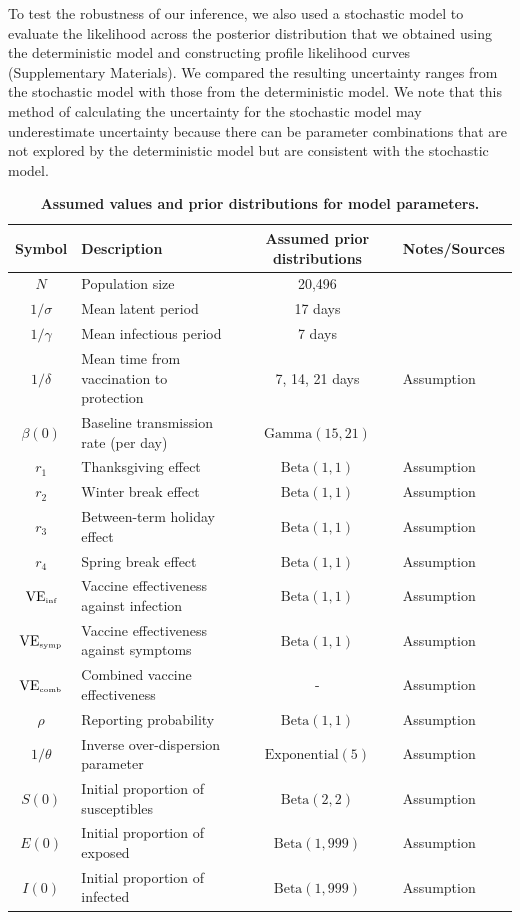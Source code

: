 \documentclass[12pt]{article}
\begin{document}
To test the robustness of our inference, we also used a stochastic model to evaluate the likelihood across the posterior distribution that we obtained using the deterministic model and constructing profile likelihood curves (Supplementary Materials).
We compared the resulting uncertainty ranges from the stochastic model with those from the deterministic model.
We note that this method of calculating the uncertainty for the stochastic model may underestimate uncertainty because there can be parameter combinations that are not explored by the deterministic model but are consistent with the stochastic model.

\begin{table}[!t]
\begin{center}
\scriptsize
\begin{tabular}{c|p{6cm}|c|l}
Symbol & Description & Assumed prior distributions & Notes/Sources\\
\hline
$N$ & Population size & 20,496 & \citep{cardemil2017effectiveness} \\
$1/\sigma$ & Mean latent period & 17 days & \cite{galazka1999mumps,lewnard2018vaccine} \\
$1/\gamma$ & Mean infectious period & 7 days & \cite{galazka1999mumps,lewnard2018vaccine} \\
$1/\delta$ & Mean time from vaccination to protection & 7, 14, 21 days & Assumption \\
$\beta(0)$ & Baseline transmission rate (per day) & $\textrm{Gamma}(15, 21)$ & \cite{lewnard2018vaccine} \\
$r_1$ & Thanksgiving effect & $\textrm{Beta}(1, 1)$ & Assumption \\
$r_2$ & Winter break effect & $\textrm{Beta}(1, 1)$ & Assumption \\
$r_3$ & Between-term holiday effect & $\textrm{Beta}(1, 1)$ & Assumption \\
$r_4$ & Spring break effect & $\textrm{Beta}(1, 1)$ & Assumption \\
$\mathrm{VE}_{\textrm{\tiny{inf}}}$ & Vaccine effectiveness against infection & $\textrm{Beta}(1, 1)$ & Assumption \\
$\mathrm{VE}_{\textrm{\tiny{symp}}}$ & Vaccine effectiveness against symptoms & $\textrm{Beta}(1, 1)$ & Assumption \\
$\mathrm{VE}_{\textrm{\tiny{comb}}}$ & Combined vaccine effectiveness & - & Assumption \\
$\rho$ & Reporting probability & $\textrm{Beta}(1, 1)$ & Assumption \\
$1/\theta$ & Inverse over-dispersion parameter & $\textrm{Exponential}(5)$ & Assumption \\
$S(0)$ & Initial proportion of susceptibles & $\textrm{Beta}(2, 2)$ & Assumption \\
$E(0)$ & Initial proportion of exposed & $\textrm{Beta}(1, 999)$ & Assumption \\
$I(0)$ & Initial proportion of infected & $\textrm{Beta}(1, 999)$ & Assumption \\
\hline
\end{tabular}
\caption{
\textbf{Assumed values and prior distributions for model parameters.}
}
\end{center}
\end{table}
\end{document}
